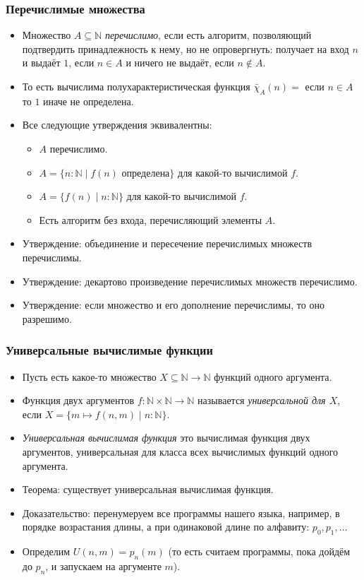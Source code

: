 \documentclass[10pt]{beamer}
\begin{document}
\begin{frame}
    \frametitle{Перечислимые множества}
    \begin{itemize}
        \item Множество $A \subseteq \mathbb{N}$ \emph{перечислимо}, если есть алгоритм, позволяющий подтвердить принадлежность к нему, но не опровергнуть: получает на вход $n$ и выдаёт $1$, если $n \in A$ и ничего не выдаёт, если $n \notin A$.
        \item То есть вычислима полухарактеристическая функция $\bar{\chi}_A(n) = $ если $n \in A$ то $1$ иначе не определена.
        \item Все следующие утверждения эквивалентны:
        \begin{itemize}
            \item $A$ перечислимо.
            \item $A = \{n : \mathbb{N} \mid f(n)$ определена$\}$ для какой-то вычислимой $f$.
            \item $A = \{f(n) \mid n : \mathbb{N}\}$ для какой-то вычислимой $f$.
            \item Есть алгоритм без входа, перечисляющий элементы $A$.
        \end{itemize}
        \item Утверждение: объединение и пересечение перечислимых множеств перечислимы.
        \item Утверждение: декартово произведение перечислимых множеств перечислимо.
        \item Утверждение: если множество и его дополнение перечислимы, то оно разрешимо.
    \end{itemize}
\end{frame}

\begin{frame}
    \frametitle{Универсальные вычислимые функции}
    \begin{itemize}
        \item Пусть есть какое-то множество $X \subseteq \mathbb{N} \to \mathbb{N}$ функций одного аргумента.
        \item Функция двух аргументов $f : \mathbb{N} \times \mathbb{N} \to \mathbb{N}$ называется \emph{универсальной для $X$}, если $X = \{m \mapsto f(n, m) \mid n : \mathbb{N}\}$.
        \item \emph{Универсальная вычислимая функция} это вычислимая функция двух аргументов, универсальная для класса всех вычислимых функций одного аргумента.
        \item Теорема: существует универсальная вычислимая функция.
        \item Доказательство: перенумеруем все программы нашего языка, например, в порядке возрастания длины, а при одинаковой длине по алфавиту: $p_0,p_1,\ldots$ 
        \item Определим $U(n,m) = p_n(m)$ (то есть считаем программы, пока дойдём до $p_n$, и запускаем на аргументе $m$).
    \end{itemize}
\end{frame}
\end{document}
